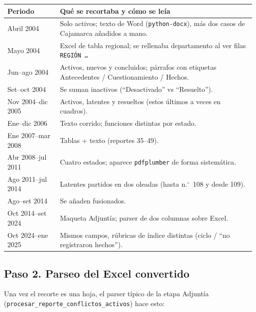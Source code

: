 \documentclass[11pt,a4paper]{article}
\begin{document}
\begin{center}
\renewcommand{\arraystretch}{1.2}
\begin{tabularx}{\textwidth}{@{}l Y@{}}
\toprule
\textbf{Periodo} & \textbf{Qué se recortaba y cómo se leía} \\
\midrule
Abril 2004 & Solo activos; texto de Word (\texttt{python-docx}), más dos casos de Cajamarca añadidos a mano. \\
Mayo 2004 & Excel de tabla regional; se rellenaba departamento al ver filas \texttt{REGIÓN \ldots} \\
Jun--ago 2004 & Activos, nuevos y concluidos; párrafos con etiquetas Antecedentes / Cuestionamiento / Hechos. \\
Set--oct 2004 & Se suman inactivos (``Desactivado'' vs ``Resuelto''). \\
Nov 2004--dic 2005 & Activos, latentes y resueltos (estos últimos a veces en cuadros). \\
Ene--dic 2006 & Texto corrido; funciones distintas por estado. \\
Ene 2007--mar 2008 & Tablas + texto (reportes 35--49). \\
Abr 2008--jul 2011 & Cuatro estados; aparece \texttt{pdfplumber} de forma sistemática. \\
Ago 2011--jul 2014 & Latentes partidos en dos oleadas (hasta n.$^\circ$~108 y desde 109). \\
Ago--set 2014 & Se añaden fusionados. \\
Oct 2014--set 2024 & Maqueta Adjuntía; parser de dos columnas sobre Excel. \\
Oct 2024--ene 2025 & Mismos campos, rúbricas de índice distintas (ciclo / ``no registraron hechos''). \\
\bottomrule
\end{tabularx}
\end{center}

\subsection{Paso 2. Parseo del Excel convertido}

Una vez el recorte es una hoja, el parser típico de la etapa Adjuntía (\texttt{procesar\_reporte\_conflictos\_activos}) hace esto:
\end{document}
